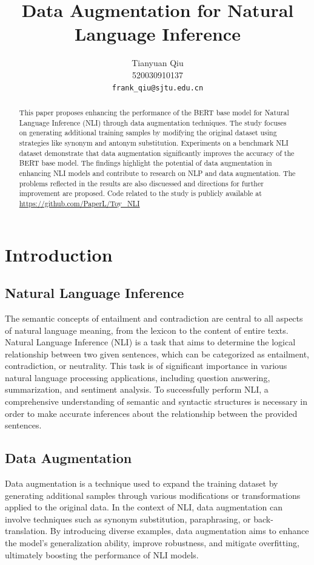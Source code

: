 \documentclass[11pt]{article}
\title{Data Augmentation for Natural Language Inference}
\author{Tianyuan Qiu \\
  520030910137 \\
  \texttt{frank\_qiu@sjtu.edu.cn} \\}
\begin{document}
\maketitle
\begin{abstract}
This paper proposes enhancing the performance of the BERT base model for Natural Language Inference (NLI) through data augmentation techniques. The study focuses on generating additional training samples by modifying the original dataset using strategies like synonym and antonym substitution. Experiments on a benchmark NLI dataset demonstrate that data augmentation significantly improves the accuracy of the BERT base model. The findings highlight the potential of data augmentation in enhancing NLI models and contribute to research on NLP and data augmentation. The problems reflected in the results are also discuessed and directions for further improvement are proposed. Code related to the study is publicly available at \url{https://github.com/PaperL/Toy_NLI}
\end{abstract}

\section{Introduction}

\subsection{Natural Language Inference}

The semantic concepts of entailment and contradiction are central to all aspects of natural language meaning, from the lexicon to the content of entire texts. Natural Language Inference (NLI) is a task that aims to determine the logical relationship between two given sentences, which can be categorized as entailment, contradiction, or neutrality. This task is of significant importance in various natural language processing applications, including question answering, summarization, and sentiment analysis. To successfully perform NLI, a comprehensive understanding of semantic and syntactic structures is necessary in order to make accurate inferences about the relationship between the provided sentences.\cite{bowman2015large}

\subsection{Data Augmentation}

Data augmentation is a technique used to expand the training dataset by generating additional samples through various modifications or transformations applied to the original data. \cite{feng2021survey} In the context of NLI, data augmentation can involve techniques such as synonym substitution, paraphrasing, or back-translation. By introducing diverse examples, data augmentation aims to enhance the model's generalization ability, improve robustness, and mitigate overfitting, ultimately boosting the performance of NLI models.
\end{document}
